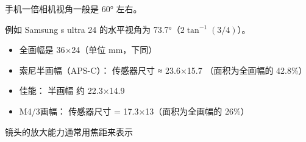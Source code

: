 
手机一倍相机视角一般是 60° 左右。

例如 Samsung s ultra 24 的水平视角为 73.7°（$2\tan^{-1}(3/4)$）。

\begin{itemize}
\item 全画幅是 36×24（单位 mm，下同）
\item 索尼半画幅（APS-C）： 传感器尺寸 ≈ 23.6×15.7 （面积为全画幅的 42.8\%）
\item 佳能： 半画幅 约 22.3×14.9
\item M4/3画幅： 传感器尺寸 = 17.3×13（面积为全画幅的 26\%）
\end{itemize}

镜头的放大能力通常用焦距来表示
\begin{itemize}

\end{itemize}
